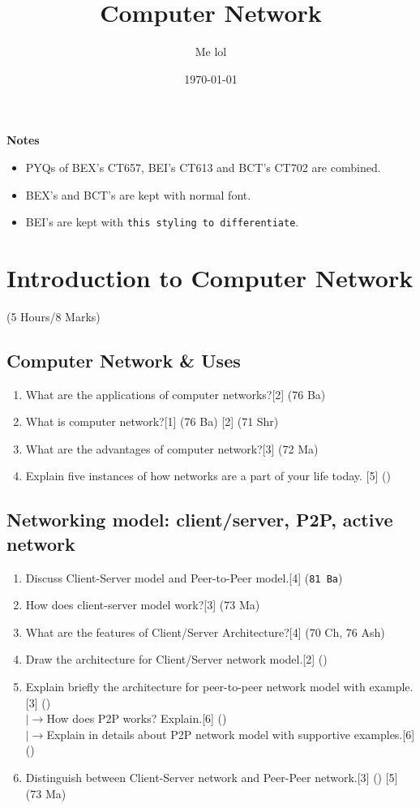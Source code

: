 \documentclass[12pt]{article}
\title{Computer Network}
\author{Me lol}
\date{\today}
\newcommand{\lb}{\\$\left|\rightarrow\right.$}
\begin{document}
\maketitle
\vspace{13cm}
\begin{large}\textbf{Notes}\end{large}
\begin{itemize}
\item PYQs of BEX's CT657, BEI's CT613 and BCT's CT702 are combined.
\item BEX's and BCT's are kept with normal font.\item BEI's are kept with \texttt{this styling to differentiate}.
\end{itemize}
\pagebreak
\tableofcontents
\pagebreak

\section{Introduction to Computer Network}
\begin{center}(5 Hours/8 Marks)\end{center}
\subsection{Computer Network \& Uses}
\begin{enumerate}[noitemsep, topsep = 0pt]
\item What are the applications of computer networks?\hfill[2] (76 Ba)
\item What is computer network?\hfill[1] (76 Ba) [2] (71 Shr)
\item What are the advantages of computer network?\hfill[3] (72 Ma)
\item Explain five instances of how networks are a part of your life today. \hfill [5] ()
\end{enumerate}
\subsection{Networking model: client/server, P2P, active network}
\begin{enumerate}[noitemsep, topsep = 0pt]
\item Discuss Client-Server model and Peer-to-Peer model.\hfill[4] (\texttt{81 Ba})
\item How does client-server model work?\hfill[3] (73 Ma)
\item What are the features of Client/Server Architecture?\hfill[4] (70 Ch, 76 Ash)
\item Draw the architecture for Client/Server network model.\hfill[2] ()
\item Explain briefly the architecture for peer-to-peer network model with example.\hfill[3] ()
\lb How does P2P works? Explain.\hfill[6] ()
\lb Explain in details about P2P network model with supportive examples.\hfill[6] ()
\item Distinguish between Client-Server network and Peer-Peer network.\hfill[3] () [5] (73 Ma)
\end{enumerate}
\end{document}
